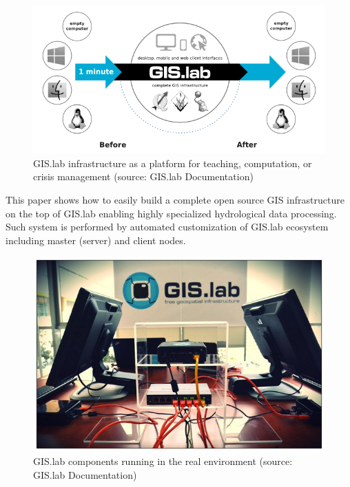 \documentclass{isprs}
\begin{document}
\begin{figure}[ht!]
\begin{center}
  \includegraphics[width=1.0\columnwidth]{figures/gislab-architecture.png}
  \caption{GIS.lab infrastructure as a platform for teaching,
    computation, or crisis management (source: GIS.lab Documentation)}
\label{fig:gislab_infrastructure}
\end{center}
\end{figure}

This paper shows how to easily build a complete open source GIS
infrastructure on the top of GIS.lab enabling highly specialized
hydrological data processing. Such system is performed by automated
customization of GIS.lab ecosystem including master (server) and
client nodes.

\begin{figure}[ht!]
\begin{center}
  \includegraphics[width=0.9\columnwidth]{figures/gislab-real.jpg}
  \caption{GIS.lab components running in the real environment (source:
    GIS.lab Documentation)}
\label{fig:gislab_infrastructure}
\end{center}
\end{figure}
\end{document}
